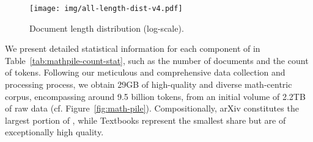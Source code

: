 \begin{table*}[ht]
\centering
\caption{The components and data statistics of \mathpile.}
\label{tab:mathpile-count-stat}

\end{table*}

\begin{wrapfigure}{r}{9cm}
\centering 
\texttt{[image: img/all-length-dist-v4.pdf]} 
\caption{Document length distribution (log-scale).} 
\label{fig:length-dist}
\end{wrapfigure}
We present detailed statistical information for each component of \mathpile in Table~\ref{tab:mathpile-count-stat}, such as the number of documents and the count of tokens. Following our meticulous and comprehensive data collection and processing process, we obtain 29GB of high-quality and diverse math-centric corpus, encompassing around 9.5 billion tokens, from an initial volume of 2.2TB of raw data (cf. Figure~\ref{fig:math-pile}). Compositionally, arXiv constitutes the largest portion of \mathpile, while Textbooks represent the smallest share but are of exceptionally high quality.

